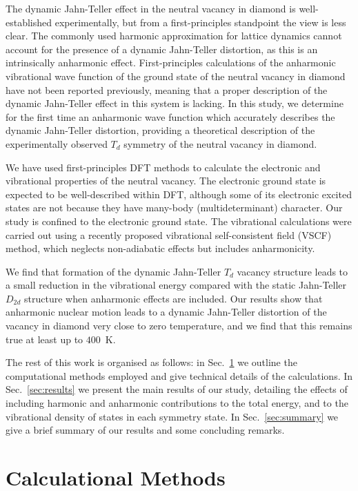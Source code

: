 \documentclass[aps,showpacs,prb,reprint,superscriptaddress,longbibliography]{revtex4-1}
\begin{document}
The dynamic Jahn-Teller effect in the neutral vacancy in diamond is
well-established experimentally, but from a first-principles
standpoint the view is less clear. The commonly used harmonic
approximation for lattice dynamics cannot account for the presence of
a dynamic Jahn-Teller distortion, as this is an intrinsically
anharmonic effect. First-principles calculations of the anharmonic
vibrational wave function of the ground state of the neutral vacancy
in diamond have not been reported previously, meaning that a proper
description of the dynamic Jahn-Teller effect in this system is
lacking. In this study, we determine for the first time an anharmonic
wave function which accurately describes the dynamic Jahn-Teller
distortion, providing a theoretical description of the experimentally
observed $T_d$ symmetry of the neutral vacancy in diamond.

We have used first-principles DFT methods\cite{jones_density_2015} to
calculate the electronic and vibrational properties of the neutral
vacancy. The electronic ground state is expected to be well-described
within DFT, although some of its electronic excited states are not
because they have many-body (multideterminant) character. Our study is
confined to the electronic ground state.  The vibrational calculations
were carried out using a recently proposed vibrational self-consistent
field (VSCF) method, \cite{monserrat_anharmonic_2013} which neglects
non-adiabatic effects but includes anharmonicity.

We find that formation of the dynamic Jahn-Teller $T_d$ vacancy
structure leads to a small reduction in the vibrational energy
compared with the static Jahn-Teller $D_{2d}$ structure when
anharmonic effects are included. Our results show that anharmonic
nuclear motion leads to a dynamic Jahn-Teller distortion of the
vacancy in diamond very close to zero temperature, and we find that
this remains true at least up to $400$~K.

The rest of this work is organised as follows: in
Sec.~\ref{sec:methods} we outline the computational methods employed
and give technical details of the calculations. In
Sec.~\ref{sec:results} we present the main results of our study,
detailing the effects of including harmonic and anharmonic
contributions to the total energy, and to the vibrational density of
states in each symmetry state. In Sec.~\ref{sec:summary} we give a
brief summary of our results and some concluding remarks.


\section{Calculational Methods} \label{sec:methods}
\end{document}
